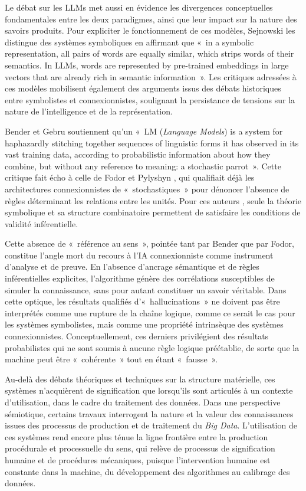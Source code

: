 \documentclass[fra, final]{anthology-ch}
\begin{document}
Le débat sur les LLMs met aussi en évidence les divergences conceptuelles fondamentales entre les deux paradigmes, ainsi que leur impact sur la nature des savoirs produits. Pour expliciter le fonctionnement de ces modèles, Sejnowski \cite{sejnowski2023} les distingue des systèmes symboliques en affirmant que «~in a symbolic representation, all pairs of words are equally similar, which strips words of their semantics. In LLMs, words are represented by pre-trained embeddings in large vectors that are already rich in semantic information~». Les critiques adressées à ces modèles mobilisent également des arguments issus des débats historiques entre symbolistes et connexionnistes, soulignant la persistance de tensions sur la nature de l’intelligence et de la représentation.

Bender et Gebru \cite{bender2021} soutiennent qu’un «~LM (\textit{Language Models}) is a system for haphazardly stitching together sequences of linguistic forms it has observed in its vast training data, according to probabilistic information about how they combine, but without any reference to meaning: a stochastic parrot~». Cette critique fait écho à celle de Fodor et Pylyshyn \cite{fodor1988}, qui qualifiait déjà les architectures connexionnistes de «~stochastiques~» pour dénoncer l'absence de règles déterminant les relations entre les unités. Pour ces auteurs \cite{fodor1988}, seule la théorie symbolique et sa structure combinatoire permettent de satisfaire les conditions de validité inférentielle. 

Cette absence de «~référence au sens~», pointée tant par Bender que par Fodor, constitue l'angle mort du recours à l’IA connexionniste comme instrument d’analyse et de preuve. En l'absence d'ancrage sémantique et de règles inférentielles explicites, l'algorithme génère des corrélations susceptibles de simuler la connaissance, sans pour autant constituer un savoir véritable. Dans cette optique, les résultats qualifiés d’«~hallucinations~» ne doivent pas être interprétés comme une rupture de la chaîne logique, comme ce serait le cas pour les systèmes symbolistes, mais comme une propriété intrinsèque des systèmes connexionnistes. Conceptuellement, ces derniers privilégient des résultats probabilistes qui ne sont soumis à aucune règle logique préétablie, de sorte que la machine peut être «~cohérente~» tout en étant «~fausse~».

Au-delà des débats théoriques et techniques sur la structure matérielle, ces systèmes n’acquièrent de signification que lorsqu’ils sont articulés à un contexte d’utilisation, dans le cadre du traitement des données. Dans une perspective sémiotique, certains travaux \cite{Boyd2012, bonenfant2020} interrogent la nature et la valeur des connaissances issues des processus de production et de traitement du \textit{Big Data}. L’utilisation de ces systèmes rend encore plus ténue la ligne frontière entre la production procédurale et processuelle du sens, qui relève de processus de signification humaine et de procédures mécaniques, puisque l’intervention humaine est constante dans la machine, du développement des algorithmes au calibrage des données. 
\end{document}
